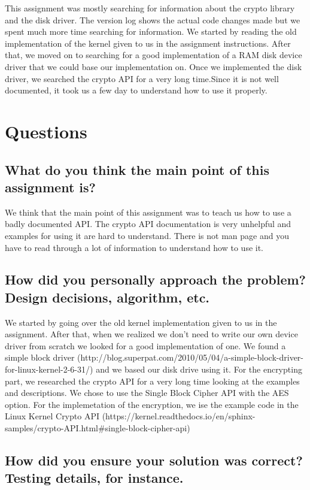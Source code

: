 \documentclass{article}
\begin{document}
This assignment was mostly searching for information about the crypto library and the disk driver. The version log shows the actual code changes made but we spent much more time searching for information. We started by reading the old implementation of the kernel given to us in the assignment instructions. After that, we moved on to searching for a good implementation of a RAM disk device driver that we could base our implementation on. Once we implemented the disk driver, we searched the crypto API for a very long time.Since it is not well documented, it took us a few day to understand how to use it properly.

\section{Questions}
\subsection{What do you think the main point of this assignment is?}

We think that the main point of this assignment was to teach us how to use a badly documented API. The crypto API documentation is very unhelpful and examples for using it are hard to understand. There is not man page and you have to read through a lot of information to understand how to use it. 

\subsection{How did you personally approach the problem? Design decisions, algorithm, etc.}

We started by going over the old kernel implementation given to us in the assignment. After that, when we realized we don't need to write our own device driver from scratch we looked for a good implementation of one. We found a simple block driver (http://blog.superpat.com/2010/05/04/a-simple-block-driver-for-linux-kernel-2-6-31/) and we based our disk drive using it. For the encrypting part, we researched the crypto API for a very long time looking at the examples and descriptions. We chose to use the Single Block Cipher API with the AES option. For the implemetation of the encryption, we ise the example code in the Linux Kernel Crypto API (https://kernel.readthedocs.io/en/sphinx-samples/crypto-API.html\#single-block-cipher-api)

\subsection{How did you ensure your solution was correct? Testing details, for instance.}
\end{document}
